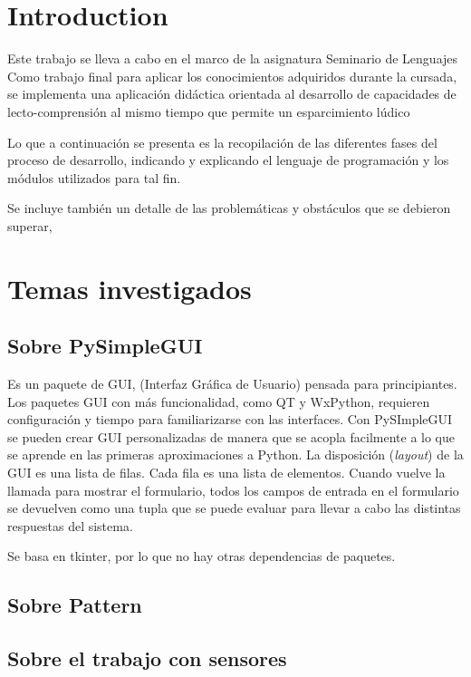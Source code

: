 \chapter{Introduction}

Este trabajo se lleva a cabo en el marco de la asignatura Seminario de Lenguajes
Como trabajo final para aplicar los conocimientos adquiridos durante la cursada, se implementa una aplicación didáctica orientada al desarrollo de capacidades de lecto-comprensión
al mismo tiempo que permite un esparcimiento lúdico

Lo que a continuación se presenta es la recopilación de las diferentes fases del proceso de desarrollo, indicando y explicando el lenguaje de programación y los módulos utilizados para tal fin.

Se incluye también un detalle de las problemáticas y obstáculos que se debieron superar, 

\chapter{Temas investigados}

\section{Sobre PySimpleGUI}
Es un paquete de GUI, (Interfaz Gráfica de Usuario) pensada para principiantes.
Los paquetes GUI con más funcionalidad, como QT y WxPython, requieren configuración y tiempo para familiarizarse con las interfaces.
Con PySImpleGUI se pueden crear GUI personalizadas de manera que se acopla facilmente a lo que se aprende en las primeras aproximaciones a Python. La disposición (\emph{layout}) de la GUI es una lista de filas. Cada fila es una lista de elementos. Cuando vuelve la llamada para mostrar el formulario, todos los campos de entrada en el formulario se devuelven como una tupla que se puede evaluar para llevar a cabo las distintas respuestas del sistema.

Se basa en tkinter, por lo que no hay otras dependencias de paquetes.

\section{Sobre Pattern}

\section{Sobre el trabajo con sensores}

